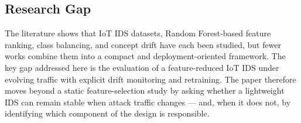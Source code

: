 \documentclass[11pt,a4paper]{article}
\begin{document}
\subsection{Research Gap}

The literature shows that IoT IDS datasets, Random Forest-based feature
ranking, class balancing, and concept drift have each been studied, but
fewer works combine them into a compact and deployment-oriented
framework. The key gap addressed here is the evaluation of a
feature-reduced IoT IDS under evolving traffic with explicit drift
monitoring and retraining. The paper therefore moves beyond a static
feature-selection study by asking whether a lightweight IDS can remain
stable when attack traffic changes --- and, when it does not, by
identifying which component of the design is responsible.
\end{document}
